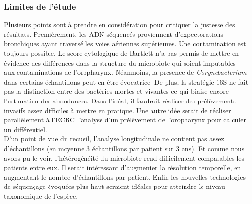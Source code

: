 \documentclass[12pt,a4paper]{article}
\begin{document}
{{\subsubsection{Limites de l'étude}
Plusieurs points sont à prendre en considération pour critiquer la justesse des résultats. Premièrement, les ADN séquencés proviennent d'expectorations bronchiques ayant traversé les voies aériennes supérieures. Une contamination est toujours possible. Le score cytologique de Bartlett n'a pas permis de mettre en évidence des différences dans la structure du microbiote qui soient imputables aux contaminations de l'oropharynx. Néanmoins, la présence de \textit{Corynebacterium} dans certains échantillons peut en être évocatrice. 
De plus, la stratégie 16S ne fait pas la distinction entre des bactéries mortes et vivantes ce qui biaise encore l'estimation des abondances. 
Dans l'idéal, il faudrait réaliser des prélèvements invasifs assez difficiles à mettre en pratique. Une autre idée serait de réaliser parallèlement à l'ECBC l'analyse d'un prélèvement de l'oropharynx pour calculer un différentiel. \\
D'un point de vue du recueil, l'analyse longitudinale ne contient pas assez d'échantillons (en moyenne 3 échantillons par patient sur 3 ans). Et comme nous avons pu le voir, l'hétérogénéité du microbiote rend difficilement comparables les patients entre eux. Il serait intéressant d'augmenter la résolution temporelle, en augmentant le nombre d'échantillons par patient. 
Enfin les nouvelles technologies de séquençage évoquées plus haut seraient idéales pour atteindre le niveau taxonomique de l'espèce. 


}}
\end{document}
